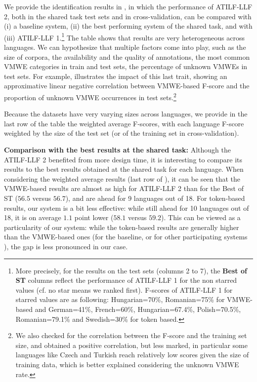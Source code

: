 \documentclass[output=paper,modfonts]{langscibook}
\begin{document}
We provide the identification results in , in which the performance of ATILF-LLF 2, both in the shared task test sets and in cross-validation, can be compared with (i) a baseline system, (ii) the best performing system of the shared task, and with (iii) ATILF-LLF 1.\footnote{More precisely, for the results on the test sets (columns 2 to 7), the \textbf{Best of ST} columns reflect the performance of ATILF-LLF 1 for the non starred values (cf. no star means we ranked first). F-scores of ATILF-LLF 1 for starred values are as following: Hungarian=70\%, Romanian=75\% for VMWE-based and German=41\%, French=60\%, Hungarian=67.4\%, Polish=70.5\%, Romanian=79.1\% and Swedish=30\% for token based.} The table shows that results are very heterogeneous across languages. We can hypothesize that multiple factors come into play, such as the size of corpora, the availability and the quality of annotations, the most common VMWE categories in train and test sets, the percentage of unknown VMWEs in test sets. For example,  illustrates the impact of this last trait, showing an approximative linear negative correlation between VMWE-based F-score and the proportion of unknown VMWE occurrences in test sets.\footnote{We also checked for the correlation between the F-score and the training set size, and obtained a positive correlation, but less marked, in particular some languages like Czech and Turkish reach relatively low scores given the size of training data, which is better explained considering the unknown VMWE rate.}

Because the datasets have very varying sizes across languages, we provide in the last row of the table the weighted average F-scores, with each language F-score weighted by the size of the test set (or of the training set in cross-validation).

\textbf{Comparison with the best results at the shared task:}
Although the ATILF-LLF 2 benefited from more design time, it is interesting to compare its results to the best results obtained at the shared task for each language. When considering the weighted average results (last row of ), it can be seen that the VMWE-based results are almost as high for ATILF-LLF 2 than for the Best of ST ($56.5$ versus $56.7$), and are ahead for 9 languages out of 18. For token-based results, our system is a bit less effective: while still ahead for 10 languages out of 18, it is on average $1.1$ point lower ($58.1$ versus $59.2$). This can be viewed as a particularity of our system: while the token-based results are generally higher than the VMWE-based ones (for the baseline, or for other participating systems \citep{MWEWorkshop}), the gap is less pronounced in our case.
\end{document}

